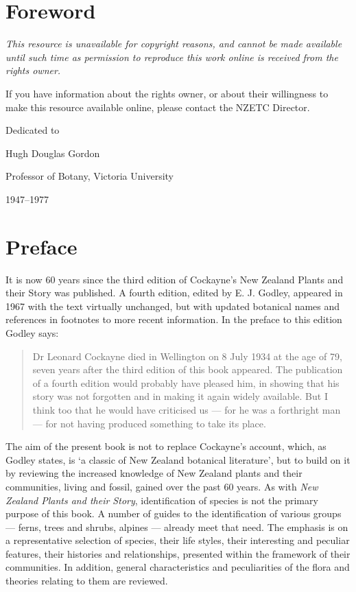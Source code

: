 \markboth{}{}

\chapter*{Foreword}

{\itshape%
    This resource is unavailable for copyright reasons, and cannot be made available until such time as permission to reproduce this work online is received from the rights owner.

    If you have information about the rights owner, or about their willingness to make this resource available online, please contact the NZETC Director.
}

\cleardoublepage%
{
    \thispagestyle{empty}
    \hspace{0pt}
    \vfill
    \begin{center}
        Dedicated to\par
        Hugh Douglas Gordon\par
        Professor of Botany, Victoria University\par
        1947–1977
    \end{center}
    \vfill
    \vfill
}

\chapter*{Preface}

It is now 60 years since the third edition of Cockayne's New Zealand Plants and their Story was published.
A fourth edition, edited by E. J. Godley, appeared in 1967 with the text virtually unchanged, but with updated botanical names and references in footnotes to more recent information.
In the preface to this edition Godley says:

\begin{quote}
    Dr Leonard Cockayne died in Wellington on 8 July 1934 at the age of 79, seven years after the third edition of this book appeared.
    The publication of a fourth edition would probably have pleased him, in showing that his story was not forgotten and in making it again widely available.
    But I think too that he would have criticised us --- for he was a forthright man --- for not having produced something to take its place.
\end{quote}

The aim of the present book is not to replace Cockayne's account, which, as Godley states, is `a classic of New Zealand botanical literature', but to build on it by reviewing the increased knowledge of New Zealand plants and their communities, living and fossil, gained over the past 60 years.
As with \emph{New Zealand Plants and their Story}, identification of species is not the primary purpose of this book.
A number of guides to the identification of various groups --- ferns, trees and shrubs, alpines --- already meet that need.
The emphasis is on a representative selection of species, their life styles, their interesting and peculiar features, their histories and relationships, presented within the framework of their communities.
In addition, general characteristics and peculiarities of the flora and theories relating to them are reviewed.

